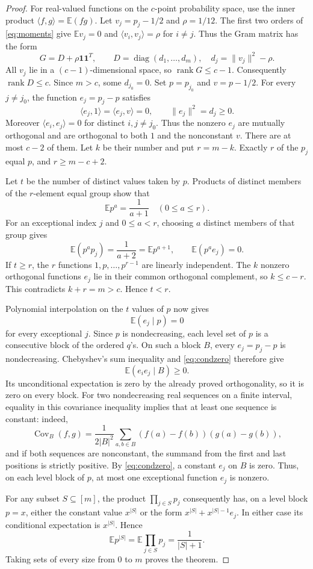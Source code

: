\documentclass[11pt]{article}
\newcommand{\E}{\mathbb E}
\begin{document}
\begin{proof}
For real-valued functions on the $c$-point probability space, use the inner
product $\langle f,g\rangle=\E(fg)$.  Let $v_j=p_j-1/2$ and
$\rho=1/12$.  The first two orders of \eqref{eq:moments} give
$\E v_j=0$ and $\langle v_i,v_j\rangle=\rho$ for $i\ne j$.
Thus the Gram matrix has the form
\[
 G=D+\rho\boldsymbol 1\boldsymbol 1^T,\qquad
 D=\operatorname{diag}(d_1,\ldots,d_m),\quad
 d_j=\lVert v_j\rVert^2-\rho.
\]
All $v_j$ lie in a $(c-1)$-dimensional space, so $\operatorname{rank}G\leq c-1$.
Consequently $\operatorname{rank}D\leq c$. Since $m>c$, some $d_{j_0}=0$.
Set $p=p_{j_0}$ and $v=p-1/2$.
For every $j\ne j_0$, the function $e_j=p_j-p$ satisfies
\[
 \langle e_j,1\rangle=\langle e_j,v\rangle=0,
 \qquad \lVert e_j\rVert^2=d_j\geq0.
\]
Moreover $\langle e_i,e_j\rangle=0$ for distinct $i,j\ne j_0$.
Thus the nonzero $e_j$ are mutually orthogonal and are orthogonal to
both $1$ and the nonconstant $v$. There are at most $c-2$ of them.
Let $k$ be their number and put $r=m-k$. Exactly $r$ of the $p_j$ equal
$p$, and $r\geq m-c+2$.

Let $t$ be the number of distinct values taken by $p$.
Products of distinct members of the $r$-element equal group show that
\[
 \E p^a=\frac1{a+1}\quad(0\leq a\leq r).
\]
For an exceptional index $j$ and $0\leq a<r$, choosing $a$ distinct
members of that group gives
\[
 \E(p^a p_j)=\frac1{a+2}=\E p^{a+1},
 \qquad \E(p^a e_j)=0.
\]
If $t\geq r$, the $r$ functions $1,p,\ldots,p^{r-1}$ are linearly independent.
The $k$ nonzero orthogonal functions $e_j$ lie in their common orthogonal
complement, so $k\leq c-r$. This contradicts $k+r=m>c$.
Hence $t<r$.

Polynomial interpolation on the $t$ values of $p$ now gives
\begin{equation}\label{eq:condzero}
 \E(e_j\mid p)=0
\end{equation}
for every exceptional $j$. Since $p$ is nondecreasing, each level set of
$p$ is a consecutive block of the ordered $q$'s. On such a block $B$,
every $e_j=p_j-p$ is nondecreasing. Chebyshev's sum inequality and
\eqref{eq:condzero} therefore give
\[
 \E(e_i e_j\mid B)\geq0.
\]
Its unconditional expectation is zero by the already proved orthogonality,
so it is zero on every block. For two nondecreasing real sequences on a
finite interval, equality in this covariance inequality implies that at
least one sequence is constant: indeed,
\[
 \operatorname{Cov}_B(f,g)
 =\frac1{2|B|^2}\sum_{a,b\in B}(f(a)-f(b))(g(a)-g(b)),
\]
and if both sequences are nonconstant, the summand from the first and last
positions is strictly positive. By \eqref{eq:condzero}, a constant $e_j$
on $B$ is zero. Thus, on each level block of $p$, at most one exceptional
function $e_j$ is nonzero.

For any subset $S\subseteq[m]$, the product $\prod_{j\in S}p_j$ consequently
has, on a level block $p=x$, either the constant value $x^{|S|}$ or the
form $x^{|S|}+x^{|S|-1}e_j$. In either case its conditional expectation is
$x^{|S|}$. Hence
\[
 \E p^{|S|}=\E\prod_{j\in S}p_j=\frac1{|S|+1}.
\]
Taking sets of every size from $0$ to $m$ proves the theorem.
\end{proof}
\end{document}
